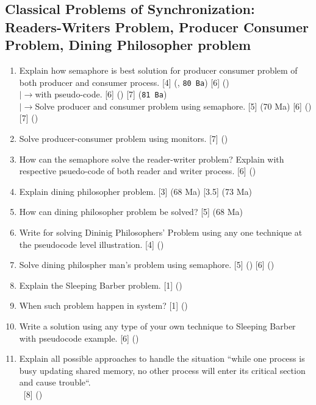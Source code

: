 \documentclass[12pt]{article}
\newcommand{\lb}{\\$\left|\rightarrow\right.$}
\newcommand{\enter}{\\\textcolor{white}{1}}
\begin{document}
	\subsection{Classical Problems of Synchronization: Readers-Writers Problem, Producer Consumer Problem, Dining Philosopher problem}
		\begin{enumerate}[noitemsep, topsep=0pt]
			\item Explain how semaphore is best solution for producer consumer problem of both producer and consumer process. \hfill [4] (, \texttt{80 Ba}) [6] ()
			\lb with pseudo-code. \hfill [6] () [7] (\texttt{81 Ba})
			\lb Solve producer and consumer problem using semaphore. \hfill [5] (70 Ma) [6] () [7] () 
			
			\item Solve producer-consumer problem using monitors. \hfill [7] ()
			
			\item How can the semaphore solve the reader-writer problem? Explain with respective psuedo-code of both reader and writer process. \hspace{7.1cm} [6] ()
			
			\item Explain dining philosopher problem. \hfill [3] (68 Ma) [3.5] (73 Ma)
			
			\item How can dining philosopher problem be solved? \hfill [5] (68 Ma)

			\item Write for solving Dininig Philosophers' Problem using any one technique at the pseudocode level illustration. \hfill [4] ()
			
			\item Solve dining philospher man's problem using semaphore. \hfill [5] () [6] ()
			
			\item Explain the Sleeping Barber problem. \hfill [1] ()
			
			\item When such problem happen in system? \hfill [1] ()
			
			\item Write a solution using any type of your own technique to Sleeping Barber with pseudocode example. \hfill [6] ()
			
			\item Explain all possible approaches to handle the situation ``while one process is busy updating shared memory, no other process will enter its critical section and cause trouble``.
			\enter\hfill [8] ()
		\end{enumerate}
\end{document}
